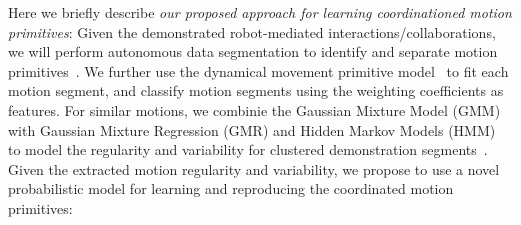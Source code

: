 \documentclass[letterpaper, 11 pt, onecolumn]{article}
\begin{document}
Here we briefly describe \textit{our proposed approach for learning coordinationed motion primitives}: Given the demonstrated robot-mediated interactions/collaborations, we will perform autonomous data segmentation to identify and separate motion primitives~\cite{fod2002automated, barbivc2004segmenting, meier2012movement}. We further use the dynamical movement primitive model~\cite{ijspeert2013dynamical} to fit each motion segment, and classify motion segments using the weighting coefficients as features. For similar motions, we combinie the Gaussian Mixture Model (GMM) with Gaussian Mixture Regression (GMR) and Hidden Markov Models (HMM) to model the regularity and variability for clustered demonstration segments~\cite{calinon2010learning}. Given the extracted motion regularity and variability, we propose to use a novel probabilistic model for learning and reproducing the coordinated motion primitives: 
\end{document}
